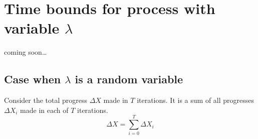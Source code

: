 \documentclass[12pt, a4paper]{article}
\theoremstyle{remark}
\newcommand{\cm}{coming soon\dots}
\begin{document}














\section{Time bounds for process with variable $\lambda$}
\cm
\subsection{Case when $\lambda$ is a random variable}
Consider the total progress $\Delta X$ made in $T$ iterations. It is a sum of all progresses $\Delta X_i$ made in each of $T$ iterations.
\[
    \Delta X = \sum_{i = 0}^{T} \Delta X_i
\]
\end{document}
